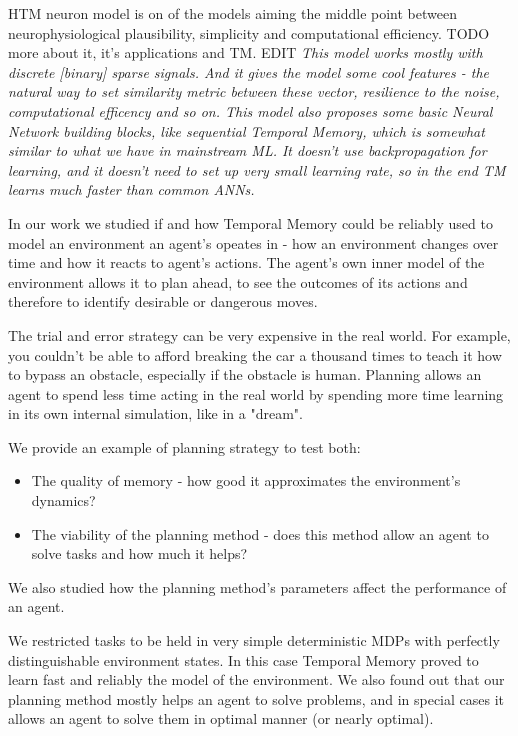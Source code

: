 \documentclass[runningheads]{llncs}
\begin{document}
HTM neuron model is on of the models aiming the middle point between neurophysiological plausibility, simplicity and computational efficiency. TODO more about it, it's applications and TM. EDIT \textit{This model works mostly with discrete [binary] sparse signals. And it gives the model some cool features - the natural way to set similarity metric between these vector, resilience to the noise, computational efficency and so on. This model also proposes some basic Neural Network building blocks, like sequential Temporal Memory, which is somewhat similar to what we have in mainstream ML. It doesn't use backpropagation for learning, and it doesn't need to set up very small learning rate, so in the end TM learns much faster than common ANNs.}

In our work we studied if and how Temporal Memory could be reliably used to model an environment an agent's opeates in - how an environment changes over time and how it reacts to agent's actions. The agent's own inner model of the environment allows it to plan ahead, to see the outcomes of its actions and therefore to identify desirable or dangerous moves.

The trial and error strategy can be very expensive in the real world. For example, you couldn't be able to afford breaking the car a thousand times to teach it how to bypass an obstacle, especially if the obstacle is human. Planning allows an agent to spend less time acting in the real world by spending more time learning in its own internal simulation, like in a "dream".

We provide an example of planning strategy to test both: 

\begin{itemize}
  \item The quality of memory - how good it approximates the environment's dynamics?
  \item The viability of the planning method - does this method allow an agent to solve tasks and how much it helps?
\end{itemize}

We also studied how the planning method's parameters affect the performance of an agent.

We restricted tasks to be held in very simple deterministic MDPs with perfectly distinguishable environment states. In this case Temporal Memory proved to learn fast and reliably the model of the environment. We also found out that our planning method mostly helps an agent to solve problems, and in special cases it allows an agent to solve them in optimal manner (or nearly optimal).
\end{document}
